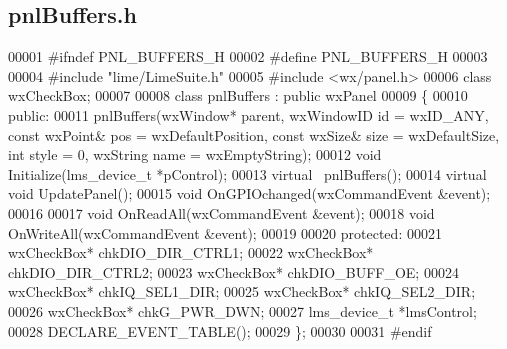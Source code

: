 \subsection{pnl\+Buffers.\+h}
\label{pnlBuffers_8h_source}

\begin{DoxyCode}
00001 \textcolor{preprocessor}{#ifndef PNL\_BUFFERS\_H}
00002 \textcolor{preprocessor}{#define PNL\_BUFFERS\_H}
00003 
00004 \textcolor{preprocessor}{#include "lime/LimeSuite.h"}
00005 \textcolor{preprocessor}{#include <wx/panel.h>}
00006 \textcolor{keyword}{class }wxCheckBox;
00007 
00008 \textcolor{keyword}{class }pnlBuffers : \textcolor{keyword}{public} wxPanel
00009 \{
00010 \textcolor{keyword}{public}:
00011     pnlBuffers(wxWindow* parent, wxWindowID \textcolor{keywordtype}{id} = wxID\_ANY, \textcolor{keyword}{const} wxPoint& pos = wxDefaultPosition, \textcolor{keyword}{const} 
      wxSize& size = wxDefaultSize, \textcolor{keywordtype}{int} style = 0, wxString name = wxEmptyString);
00012     \textcolor{keywordtype}{void} Initialize(lms_device_t *pControl);
00013     \textcolor{keyword}{virtual} ~pnlBuffers();
00014     \textcolor{keyword}{virtual} \textcolor{keywordtype}{void} UpdatePanel();
00015     \textcolor{keywordtype}{void} OnGPIOchanged(wxCommandEvent &event);
00016 
00017     \textcolor{keywordtype}{void} OnReadAll(wxCommandEvent &event);
00018     \textcolor{keywordtype}{void} OnWriteAll(wxCommandEvent &event);
00019 
00020 \textcolor{keyword}{protected}:
00021     wxCheckBox* chkDIO_DIR_CTRL1;
00022     wxCheckBox* chkDIO_DIR_CTRL2;
00023     wxCheckBox* chkDIO_BUFF_OE;
00024     wxCheckBox* chkIQ_SEL1_DIR;
00025     wxCheckBox* chkIQ_SEL2_DIR;
00026     wxCheckBox* chkG_PWR_DWN;
00027     lms_device_t *lmsControl;
00028     DECLARE_EVENT_TABLE();
00029 \};
00030 
00031 \textcolor{preprocessor}{#endif}
\end{DoxyCode}
